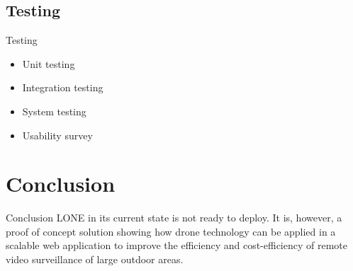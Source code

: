 \subsection{Testing}
\begin{frame}{Testing}
\begin{itemize}
	\item Unit testing
	\item Integration testing
	\item System testing
	\item Usability survey
\end{itemize}
\end{frame}

\section{Conclusion}
\begin{frame}{Conclusion}
LONE in its current state is not ready to deploy. It is, however, a proof of concept solution showing how drone technology can be applied in a scalable web application to improve the efficiency and cost-efficiency of remote video surveillance of large outdoor areas.
\end{frame}